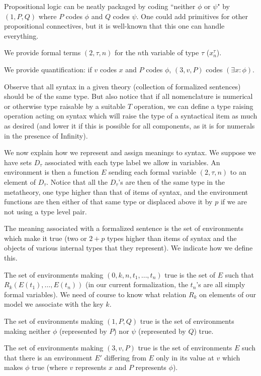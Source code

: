\documentclass[12pt]{article}
\begin{document}
Propositional logic can be neatly packaged by coding ``neither $\phi$ or $\psi$" by $(1,P,Q)$ where $P$ codes $\phi$ and $Q$ codes $\psi$.  One could add primitives for other propositional connectives, but it is well-known that this one can handle everything.

We provide formal terms $(2,\tau,n)$ for the $n$th variable of type $\tau$ ($x^{\tau}_n$).

We provide quantification:  if $v$ codes $x$ and $P$ codes $\phi$, $(3,v,P)$ codes $(\exists x:\phi)$.

Observe that all syntax in a given theory (collection of formalized sentences) should be of the same type.  But also notice that if all nomenclature is numerical or otherwise type raisable by a suitable $T$ operation, we can define a type raising operation acting on syntax which will raise the type of a syntactical item as much as desired (and lower it if this is possible for all components, as it is for numerals in the presence of Infinity).

We now explain how we represent and assign meanings to syntax.  We suppose we have sets $D_{\tau}$ associated with each type label we allow in variables.
An environment is then a function $E$ sending each formal variable $(2,\tau,n)$ to an element of $D_{\tau}$.  Notice that all the $D_{\tau}$'s are then of the same type
in the metatheory, one type higher than that of items of syntax, and the environment functions are then  either of that same type or displaced above it by $p$ if we are not using a type level pair.

The meaning associated with a formalized sentence is the set of environments which make it true (two or $2+p$ types higher than items of syntax and the objects of various internal types that they represent).  We indicate how we define this.

The set of environments making $(0,k,n,t_1,\ldots,t_n)$ true is the set of $E$ such that $R_k(E(t_1),\ldots,E(t_n))$ (in our current formalization, the $t_n$'s are all simply formal variables).  We need of course to know what relation $R_k$ on elements of our model we associate with the key $k$.

The set of environments making $(1,P,Q)$ true is the set of environments making neither $\phi$ (represented by $P$) nor $\psi$ (represented by $Q$) true.

The set of environments making $(3,v,P)$ true is the set of environments $E$ such that there is an environment $E'$ differing from $E$ only in its value at $v$ which makes
$\phi$ true (where $v$ represents $x$ and $P$ represents $\phi$).
\end{document}
